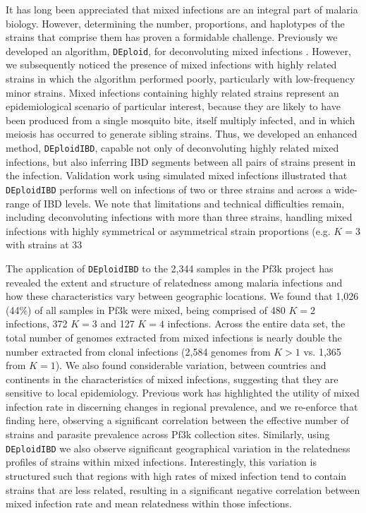 \documentclass[9pt,lineno]{elife}
\begin{document}
It has long been appreciated that mixed infections are an integral part of malaria biology.  However, determining the number, proportions, and haplotypes of the strains that comprise them has proven a formidable challenge.  Previously we developed an algorithm, \texttt{DEploid}, for deconvoluting mixed infections \citep{Zhu2017}.  However, we subsequently noticed the presence of mixed infections with highly related strains in which the algorithm performed poorly, particularly with low-frequency minor strains.  Mixed infections containing highly related strains represent an epidemiological scenario of particular interest, because they are likely to have been produced from a single mosquito bite, itself multiply infected, and in which meiosis has occurred to generate sibling strains. Thus, we developed an enhanced method, \texttt{DEploidIBD}, capable not only of deconvoluting highly related mixed infections, but also inferring IBD segments between all pairs of strains present in the infection.  Validation work using simulated mixed infections illustrated that \texttt{DEploidIBD} performs well on infections of two or three strains and across a wide-range of IBD levels.  We note that limitations and technical difficulties remain, including deconvoluting infections with more than three strains, handling mixed infections with highly symmetrical or asymmetrical strain proportions (e.g. $K=3$ with strains at 33%

The application of \texttt{DEploidIBD} to the 2,344 samples in the Pf3k project has revealed the extent and structure of relatedness among malaria infections and how these characteristics vary between geographic locations. We found that 1,026 (44\%) of all samples in Pf3k were mixed, being comprised of 480 $K=2$ infections, 372 $K=3$ and 127 $K=4$ infections. Across the entire data set, the total number of genomes extracted from mixed infections is nearly double the number extracted from clonal infections (2,584 genomes from $K>1$ vs. 1,365 from $K=1$).  We also found considerable variation, between countries and continents in the characteristics of mixed infections, suggesting that they are sensitive to local epidemiology.  Previous work has highlighted the utility of mixed infection rate in discerning changes in regional prevalence, and we re-enforce that finding here, observing a significant correlation between the effective number of strains and parasite prevalence across Pf3k collection sites. Similarly, using \texttt{DEploidIBD} we also observe significant geographical variation in the relatedness profiles of strains within mixed infections.  Interestingly, this variation is structured such that regions with high rates of mixed infection tend to contain strains that are less related, resulting in a significant negative correlation between mixed infection rate and mean relatedness within those infections.
\end{document}

